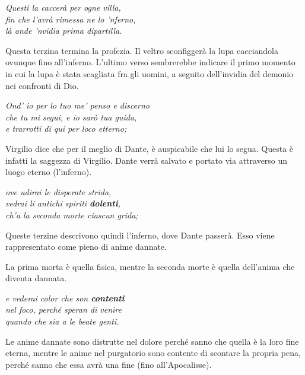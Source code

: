 \documentclass[a4paper]{article}
\begin{document}
\begin{center}
    \textit{Questi la caccerà per ogne villa,} \\
    \textit{fin che l'avrà rimessa ne lo 'nferno,} \\
    \textit{là onde 'nvidia prima dipartilla.}
\end{center}

Questa terzina termina la profezia.
Il veltro sconfiggerà la lupa cacciandola ovunque fino all'inferno.
L'ultimo verso sembrerebbe indicare il primo momento in cui la lupa è stata scagliata
fra gli uomini, a seguito dell'invidia del demonio nei confronti di Dio.

\begin{center}
    \textit{Ond' io per lo tuo me' penso e discerno} \\
    \textit{che tu mi segui, e io sarò tua guida,} \\
    \textit{e trarrotti di qui per loco etterno;}
\end{center}

Virgilio dice che per il meglio di Dante, è auspicabile che lui lo segua.
Questa è infatti la saggezza di Virgilio.
Dante verrà salvato e portato via attraverso un luogo eterno (l'inferno).

\begin{center}
    \textit{ove udirai le disperate strida,} \\
    \textit{vedrai li antichi spiriti \textbf{dolenti},} \\
    \textit{ch'a la seconda morte ciascun grida;}
\end{center}

Queste terzine descrivono quindi l'inferno, dove Dante passerà.
Esso viene rappresentato come pieno di anime dannate.

La prima morta è quella fisica, mentre la seconda morte è quella dell'anima che
diventa dannata.

\begin{center}
    \textit{e vederai color che son \textbf{contenti}} \\
    \textit{nel foco, perché speran di venire} \\
    \textit{quando che sia a le beate genti.}
\end{center}

Le anime dannate sono distrutte nel dolore perché sanno che quella è la loro
fine eterna, mentre le anime nel purgatorio sono contente di scontare la propria pena,
perché sanno che essa avrà una fine (fino all'Apocalisse).
\end{document}

